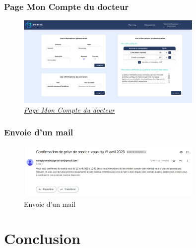 \documentclass[a4paper]{report}
\begin{document}
\subsection{Page Mon Compte du docteur}
\begin{figure}[H]
    \vspace{-10pt}
    \centering
    \includegraphics[width=0.8\textwidth]{captures/doctor-account.png}
    \caption{\textit{\hyperref[edit2]{Page Mon Compte du docteur}}}
    \label{fig:DCU29}
\end{figure}

\subsection{Envoie d'un mail}
\begin{figure}[H]
    \vspace{-10pt}
    \centering
    \includegraphics[width=0.8\textwidth]{captures/mail.png}
    \caption{Envoie d'un mail}
    \label{fig:DCU30}
\end{figure}

\chapter{Conclusion}
\end{document}
